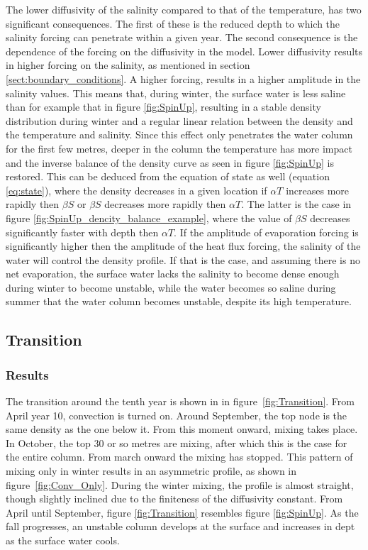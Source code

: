 \documentclass[twocolumn]{article}
\begin{document}
The lower diffusivity of the salinity compared to that of the temperature, has two significant consequences. The first of these is the reduced depth to which the salinity forcing can penetrate within a given year. The second consequence is the dependence of the forcing on the diffusivity in the model. Lower diffusivity results in higher forcing on the salinity, as mentioned in section \ref{sect:boundary_conditions}. A higher forcing, results in a higher amplitude in the salinity values. This means that, during winter, the surface water is less saline than for example that in figure \ref{fig:SpinUp}, resulting in a stable density distribution during winter and a regular linear relation between the density and the temperature and salinity. Since this effect only penetrates the water column for the first few metres, deeper in the column the temperature has more impact and the inverse balance of the density curve as seen in figure \ref{fig:SpinUp} is restored. This can be deduced from the equation of state as well (equation \ref{eq:state}), where the density decreases in a given location if $\alpha T$ increases more rapidly then $\beta S$ or $\beta S$ decreases more rapidly then $\alpha T$. The latter is the case in figure \ref{fig:SpinUp_dencity_balance_example}, where the value of $\beta S$ decreases significantly faster with depth then $\alpha T$. If the amplitude of evaporation forcing is significantly higher then the amplitude of the heat flux forcing, the salinity of the water will control the density profile. If that is the case, and assuming there is no net evaporation, the surface water lacks the salinity to become dense enough during winter to become unstable, while the water becomes so saline during summer that the water column becomes unstable, despite its high temperature.
 
\subsection{Transition}
\subsubsection{Results}
The transition around the tenth year is shown in in figure~\ref{fig:Transition}. From April year 10, convection is turned on. Around September, the top node is the same density as the one below it. From this moment onward, mixing takes place. In October, the top 30 or so metres are mixing, after which this is the case for the entire column. From march onward the mixing has stopped. This pattern of mixing only in winter results in an asymmetric profile, as shown in figure~\ref{fig:Conv_Only}. During the winter mixing, the profile is almost straight, though slightly inclined due to the finiteness of the diffusivity constant. From April until September, figure \ref{fig:Transition} resembles figure \ref{fig:SpinUp}. As the fall progresses, an unstable column develops at the surface and increases in dept as the surface water cools. 
\end{document}
